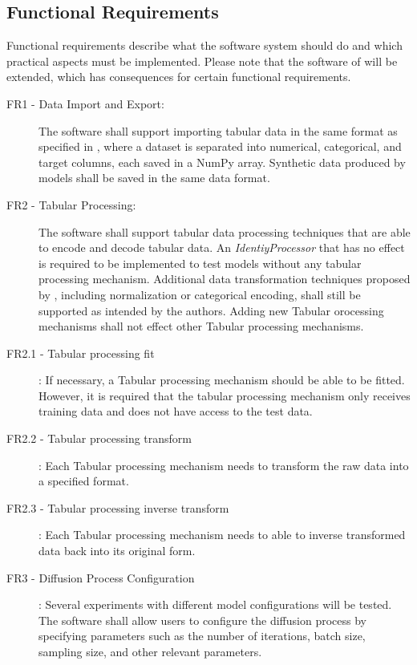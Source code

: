 \subsection*{Functional Requirements}
\label{sec:func_requirements}
Functional requirements describe what the software system should do and which practical aspects must be implemented.
Please note that the software of \cite{kotelnikov2022TabDDPMModellingTabular} will be extended, which has consequences for certain functional requirements.

\begin{description}
	\item[FR1 - Data Import and Export:]
		The software shall support importing tabular data in the same format as specified in \cite{kotelnikov2022TabDDPMModellingTabular},
		where a dataset is separated into numerical, categorical, and target columns, each saved in a NumPy \cite{harris2020array} array.
		Synthetic data produced by models shall be saved in the same data format.

	\item[FR2 - Tabular Processing:]
		The software shall support tabular data processing techniques that are able to encode and decode tabular data.
		An \textit{IdentiyProcessor} that has no effect is required to be implemented to test models without any tabular processing mechanism.
		Additional data transformation techniques proposed by \cite{kotelnikov2022TabDDPMModellingTabular}, including normalization or categorical encoding, shall still be supported as intended by the authors.
		Adding new Tabular orocessing mechanisms shall not effect other Tabular processing mechanisms.

		\item[FR2.1 - Tabular processing fit]:
		If necessary, a Tabular processing mechanism should be able to be fitted.
		However, it is required that the tabular processing mechanism only receives training data and does not have access to the test data.

		\item[FR2.2 - Tabular processing transform]:
		Each Tabular processing mechanism needs to transform the raw data into a specified format.

		\item[FR2.3 - Tabular processing inverse transform]:
		Each Tabular processing mechanism needs to able to inverse transformed data back into its original form.

		\item[FR3 - Diffusion Process Configuration]:
		Several experiments with different model configurations will be tested.
		The software shall allow users to configure the diffusion process by specifying parameters such as the number of iterations, batch size, sampling size, and other relevant parameters.


\end{description}
